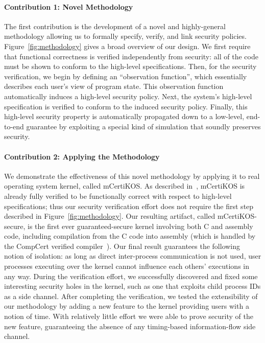 \paragraph{Contribution 1: Novel Methodology}
The first contribution is the development of a novel and
highly-general methodology allowing us to formally specify, verify, 
and link security policies. Figure~\ref{fig:methodology}
gives a broad overview of our design. We first require that
functional correctness is verified independently from security: 
all of the code must be shown to conform to the high-level 
specifications. Then, for the security verification, we
begin by defining an ``observation function'', which essentially 
describes each user's view of program state. This observation
function automatically induces a high-level security policy.
Next, the system's high-level specification is verified to conform
to the induced security policy. Finally, this high-level security 
property is automatically propagated down to a low-level, end-to-end
guarantee by exploiting a special kind of simulation that soundly
preserves security.

\paragraph{Contribution 2: Applying the Methodology}
We demonstrate the effectiveness of this novel methodology by
applying it to real operating system kernel,
called mCertiKOS. As described in~\cite{certikos-popl}, 
mCertiKOS is already fully verified to be functionally correct
with respect to high-level specifications; thus our security
verification effort does not require the first step described in 
Figure~\ref{fig:methodology}. Our resulting artifact,
called mCertiKOS-secure, is the first
ever guaranteed-secure kernel involving both C and assembly code,
including compilation from the C code into assembly (which is handled
by the CompCert verified compiler~\cite{compcert}). Our final
result guarantees the following notion of isolation: as long as 
direct inter-process communication is not used, user processes 
executing over the kernel cannot influence each others' executions 
in any way. During the verification effort, we successfully 
discovered and fixed some interesting security holes in the kernel, 
such as one that exploits child process IDs as a side channel. 
After completing the verification, we tested the
extensibility of our methodology by adding a new feature to the
kernel providing users with a notion of time. With relatively
little effort we were able to prove security of the new feature,
guaranteeing the absence of any timing-based information-flow side 
channel.

